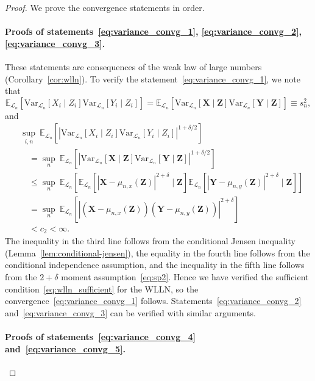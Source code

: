 \documentclass[12pt]{article}
\theoremstyle{definition}
\theoremstyle{remark}
\newcommand{\E}{\mathbb E}								%
\newcommand{\V}{\mathrm{Var}}							%
\newcommand{\prx}{\bm X}								%
\newcommand{\srx}{X}									%
\newcommand{\prz}{\bm Z}								%
\newcommand{\srz}{Z}									%
\newcommand{\pry}{{\bm Y}}								%
\newcommand{\sry}{Y}									%
\newcommand{\law}{\mathcal L}							%
\begin{document}
\begin{proof}

	We prove the convergence statements in order.

\paragraph{Proofs of statements~\eqref{eq:variance_convg_1}, \eqref{eq:variance_convg_2}, \eqref{eq:variance_convg_3}.}

These statements are consequences of the weak law of large numbers (Corollary~\ref{cor:wlln}). To verify the statement~\eqref{eq:variance_convg_1}, we note that
\begin{equation*}
	\E_{\law_n}[\V_{\law_n}[\srx_i\mid \srz_i]\V_{\law_n}[\sry_i \mid \srz_i]] = \E_{\law_n}[\V_{\law_n}[\prx\mid \prz]\V_{\law_n}[\pry \mid \prz]] \equiv s^2_n, 
\end{equation*}
and
\begin{equation}
	\begin{split}
	&\sup_{i,n} \ \E_{\law_n}[|\V_{\law_n}[\srx_i\mid \srz_i]\V_{\law_n}[\sry_i \mid \srz_i]|^{1+\delta/2}] \\
	&\quad= \sup_n\ \E_{\law_n}[|\V_{\law_n}[\prx\mid \prz]\V_{\law_n}[\pry \mid \prz]|^{1+\delta/2}] \\
	&\quad\leq \sup_n\ \E_{\law_n}[\E_{\law_n}[|\prx - \mu_{n,x}(\prz)|^{2+\delta} \mid \prz]\E_{\law_n}[|\pry - \mu_{n,y}(\prz)|^{2+\delta} \mid \prz]] \\
	&\quad= \sup_n\ \E_{\law_n}[|(\prx - \mu_{n,x}(\prz))(\pry - \mu_{n,y}(\prz))|^{2 + \delta}] \\
	&\quad< c_2 < \infty.
	\end{split}
	\label{eq:variance-bound-derivation}
\end{equation}
The inequality in the third line follows from the conditional Jensen inequality (Lemma~\ref{lem:conditional-jensen}), the equality in the fourth line follows from the conditional independence assumption, and the inequality in the fifth line follows from the $2+\delta$ moment assumption~\eqref{eq:sp2}. Hence we have verified the sufficient condition~\eqref{eq:wlln_sufficient} for the WLLN, so the convergence~\eqref{eq:variance_convg_1} follows. Statements~\eqref{eq:variance_convg_2} and~\eqref{eq:variance_convg_3} can be verified with similar arguments.

\paragraph{Proofs of statements~\eqref{eq:variance_convg_4} and~\eqref{eq:variance_convg_5}.} 


\end{proof}
\end{document}
